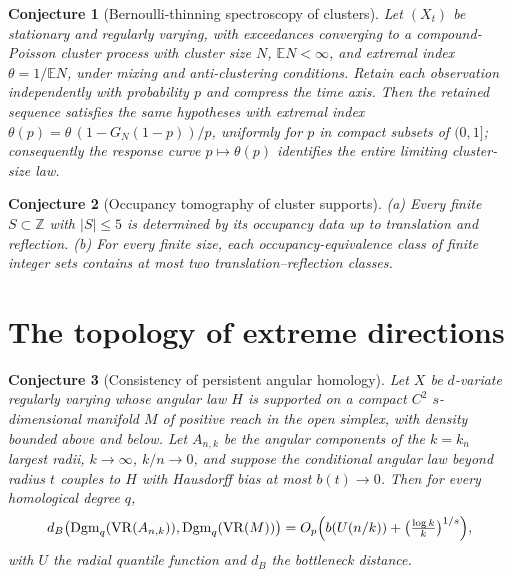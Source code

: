 \documentclass[11pt]{article}
\newtheorem{conjecture}{Conjecture}
\theoremstyle{definition}
\newcommand{\E}{\mathbb E}
\newcommand{\Z}{\mathbb Z}
\providecommand{\Z}{\mathbb Z}
\providecommand{\E}{\mathbb E}
\begin{document}
\begin{conjecture}[Bernoulli-thinning spectroscopy of clusters]\label{ah5}
Let $(X_t)$ be stationary and regularly varying, with exceedances converging to a compound-Poisson cluster process with cluster size $N$, $\E N<\infty$, and extremal index $\theta=1/\E N$, under mixing and anti-clustering conditions.  Retain each observation independently with probability $p$ and compress the time axis.  Then the retained sequence satisfies the same hypotheses with extremal index $\theta(p)=\theta\,(1-G_N(1-p))/p$, uniformly for $p$ in compact subsets of $(0,1]$; consequently the response curve $p\mapsto\theta(p)$ identifies the entire limiting cluster-size law.
\end{conjecture}

\begin{conjecture}[Occupancy tomography of cluster supports]\label{ah6}
(a) Every finite $S\subset\Z$ with $|S|\le5$ is determined by its occupancy data up to translation and reflection.  (b) For every finite size, each occupancy-equivalence class of finite integer sets contains at most two translation--reflection classes.
\end{conjecture}

\section{The topology of extreme directions}

\begin{conjecture}[Consistency of persistent angular homology]\label{ah7}
Let $X$ be $d$-variate regularly varying whose angular law $H$ is supported on a compact $C^2$ $s$-dimensional manifold $M$ of positive reach in the open simplex, with density bounded above and below.  Let $A_{n,k}$ be the angular components of the $k=k_n$ largest radii, $k\to\infty$, $k/n\to0$, and suppose the conditional angular law beyond radius $t$ couples to $H$ with Hausdorff bias at most $b(t)\to0$.  Then for every homological degree $q$,
\[
d_B\bigl(\operatorname{Dgm}_q(\operatorname{VR}(A_{n,k})),\operatorname{Dgm}_q(\operatorname{VR}(M))\bigr)
=O_p\Bigl(b(U(n/k))+\bigl(\tfrac{\log k}k\bigr)^{1/s}\Bigr),
\]
with $U$ the radial quantile function and $d_B$ the bottleneck distance.
\end{conjecture}
\end{document}

